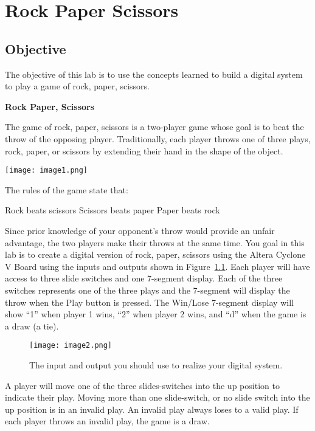 \chapter{Rock Paper Scissors}
\label{RPS}
\graphicspath{ {./Lab03RockPaperScissor/Fig} }


\hypertarget{objective}{%
\section{Objective }
\label{objective}}

The objective of this lab is to use the concepts learned to build a
digital system to play a game of rock, paper, scissors.

\textbf{Rock Paper, Scissors}

The game of rock, paper, scissors is a two-player game whose goal is to
beat the throw of the opposing player. Traditionally, each player throws
one of three plays, rock, paper, or scissors by extending their hand in
the shape of the object.

\texttt{[image:  image1.png]}

The rules of the game state that:

Rock beats scissors Scissors beats paper Paper beats rock

Since prior knowledge of your opponent's throw would provide an unfair
advantage, the two players make their throws at the same time. You goal 
in this lab is to create a digital version of rock, paper,
scissors using the Altera Cyclone V Board using the inputs and outputs
shown in Figure~\ref{figure:systemIO}. Each player will have access to three slide switches
and one 7-segment display. Each of the three switches represents one of
the three plays and the 7-segment will display the throw when the Play
button is pressed. The Win/Lose 7-segment display will show ``1'' when
player 1 wins, ``2'' when player 2 wins, and ``d'' when the game is a
draw (a tie).

\begin{figure}[ht]
\texttt{[image:  image2.png]}
\caption{The input and output you should use to realize your digital system.}
\label{figure:systemIO}
\end{figure}



A player will move one of the three slides-switches into the up position
to indicate their play. Moving more than one slide-switch, or no slide
switch into the up position is in an invalid play. An invalid play
always loses to a valid play. If each player throws an invalid play, the
game is a draw.

